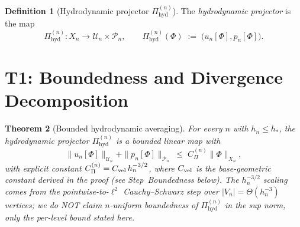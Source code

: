 \documentclass[11pt, a4paper]{amsart}
\newtheorem{theorem}{Theorem}[section]
\theoremstyle{definition}
\newtheorem{definition}[theorem]{Definition}
\newcommand{\Pihyd}{\Pi_{\mathrm{hyd}}}
\begin{document}
\begin{definition}[Hydrodynamic projector $\Pihyd^{(n)}$]
\label{def:Pihyd}
The \emph{hydrodynamic projector} is the map
\[
  \Pihyd^{(n)} \colon X_n \to \mathcal U_n \times \mathcal P_n,
  \qquad \Pihyd^{(n)}(\Phi) \;:=\; \bigl(u_n[\Phi],
  p_n[\Phi]\bigr).
\]
\end{definition}

\section{T1: Boundedness and Divergence Decomposition}
\label{sec:bounded}

\begin{theorem}[Bounded hydrodynamic averaging]
\label{thm:pihyd-bounded}
For every $n$ with $h_n \leq h_\ast$, the hydrodynamic
projector $\Pihyd^{(n)}$ is a bounded linear map with
\[
  \|u_n[\Phi]\|_{\mathcal U_n} + \|p_n[\Phi]\|_{\mathcal P_n}
    \;\leq\; C_\Pi^{(n)} \|\Phi\|_{X_n},
\]
with explicit constant $C_\Pi^{(n)} = C_{\rm vel}\,h_n^{-3/2}$,
where $C_{\rm vel}$ is the base-geometric constant derived in
the proof (see Step~\emph{Boundedness} below). The $h_n^{-3/2}$
scaling comes from the pointwise-to-$\ell^2$ Cauchy--Schwarz step
over $|V_n| = \Theta(h_n^{-3})$ vertices; we do NOT claim
$n$-uniform boundedness of $\Pihyd^{(n)}$ in the sup norm, only
the per-level bound stated here.


\end{theorem}
\end{document}
